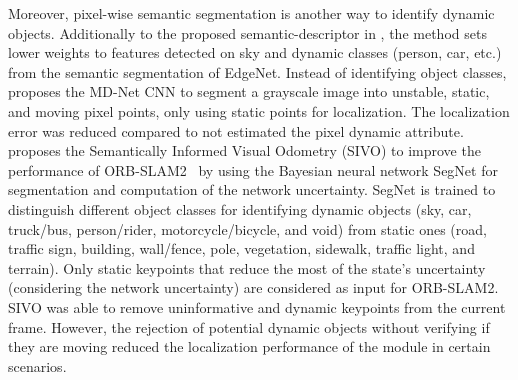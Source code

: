 Moreover, pixel-wise semantic segmentation is another way to identify dynamic objects.
Additionally to the proposed semantic-descriptor in \cite{singh-et-al:2021:9564866}, the method sets lower weights to features detected on sky and dynamic classes (person, car, etc.) from the semantic segmentation of EdgeNet.
Instead of identifying object classes, \cite{song-et-al:2019:8967749} proposes the MD-Net CNN to segment a grayscale image into unstable, static, and moving pixel points, only using static points for localization. The localization error was reduced compared to not estimated the pixel dynamic attribute.
\cite{ganti-waslander:2019:00024} proposes the Semantically Informed Visual Odometry (SIVO) to improve the performance of ORB-SLAM2~\parencite{discussion:orb-slam2} by using the Bayesian neural network SegNet for segmentation and computation of the network uncertainty. SegNet is trained to distinguish different object classes for identifying dynamic objects (sky, car, truck/bus, person/rider, motorcycle/bicycle, and void) from static ones (road, traffic sign, building, wall/fence, pole, vegetation, sidewalk, traffic light, and terrain). Only static keypoints that reduce the most of the state's uncertainty (considering the network uncertainty) are considered as input for ORB-SLAM2.
SIVO was able to remove uninformative and dynamic keypoints from the current frame. However, the rejection of potential dynamic objects without verifying if they are moving reduced the localization performance of the module in certain scenarios.

